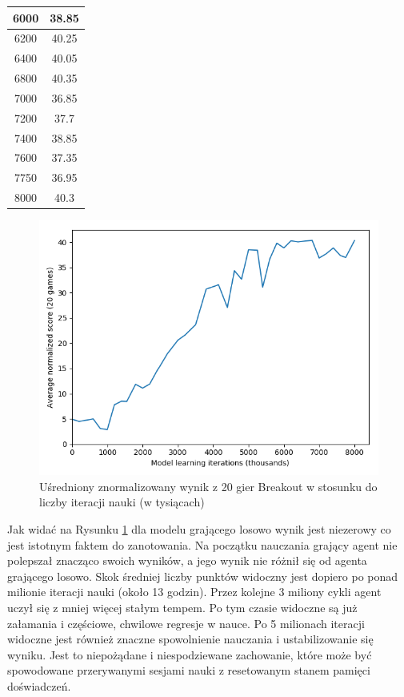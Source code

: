 \documentclass[12pt]{article}
\begin{document}
\begin{center}
\begin{table}[H]
\begin{tabular}{|c|c|}
\hline
6000  &  38.85 \\
\hline
6200  &  40.25 \\
\hline
6400  &  40.05 \\
\hline
6800  &  40.35 \\
\hline
7000  &  36.85 \\
\hline
7200  &  37.7 \\
\hline
7400  &  38.85 \\
\hline
7600  &  37.35 \\
\hline
7750  &  36.95 \\
\hline
8000  &  40.3 \\
\hline
\end{tabular}
\end{table}
\end{center}

\begin{figure}[H]
\centering \includegraphics[scale=0.7]{20games.png}
\caption{Uśredniony znormalizowany wynik z 20 gier Breakout w stosunku do liczby iteracji nauki (w tysiącach)}
\label{results}
\end{figure}


 Jak widać na Rysunku \ref{results} dla modelu grającego losowo wynik jest niezerowy co jest istotnym faktem do zanotowania. Na początku nauczania grający agent nie polepszał znacząco swoich wyników, a jego wynik nie różnił się od agenta grającego losowo. Skok średniej liczby punktów widoczny jest dopiero po ponad milionie iteracji nauki (około 13 godzin). Przez kolejne 3 miliony cykli agent uczył się z mniej więcej stałym tempem. Po tym czasie widoczne są już załamania i częściowe, chwilowe regresje w nauce. Po 5 milionach iteracji widoczne jest również znaczne spowolnienie nauczania i ustabilizowanie się wyniku. Jest to niepożądane i niespodziewane zachowanie, które może być spowodowane przerywanymi sesjami nauki z resetowanym stanem pamięci doświadczeń.
\end{document}
